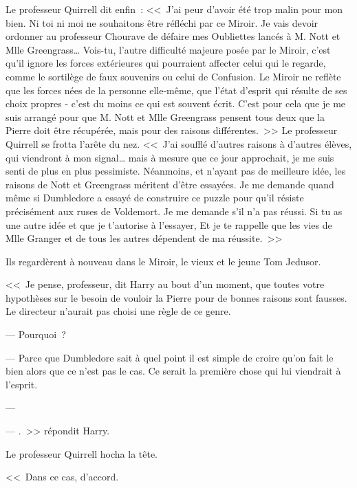 Le professeur Quirrell dit enfin~: <<~J'ai peur d'avoir été trop malin pour mon bien. Ni toi ni moi ne souhaitons être réfléchi par ce Miroir. Je vais devoir ordonner au professeur Chourave de défaire mes Oubliettes lancés à M. Nott et Mlle Greengrass… Vois-tu, l'autre difficulté majeure posée par le Miroir, c'est qu'il ignore les forces extérieures qui pourraient affecter celui qui le regarde, comme le sortilège de faux souvenirs ou celui de Confusion. Le Miroir ne reflète que les forces nées de la personne elle-même, que l'état d'esprit qui résulte de ses choix propres - c'est du moins ce qui est souvent écrit. C'est pour cela que je me suis arrangé pour que M. Nott et Mlle Greengrass pensent tous deux que la Pierre doit être récupérée, mais pour des raisons différentes.~>> Le professeur Quirrell se frotta l'arête du nez. <<~J'ai soufflé d'autres raisons à d'autres élèves, qui viendront à mon signal… mais à mesure que ce jour approchait, je me suis senti de plus en plus pessimiste. Néanmoins, et n'ayant pas de meilleure idée, les raisons de Nott et Greengrass méritent d'être essayées. Je me demande quand même si Dumbledore a essayé de construire ce puzzle pour qu'il résiste précisément aux ruses de Voldemort. Je me demande s'il n'a pas réussi. Si tu as une autre idée et que je t'autorise à l'essayer,  Et je te rappelle que les vies de Mlle Granger et de tous les autres dépendent de ma réussite.~>>

Ils regardèrent à nouveau dans le Miroir, le vieux et le jeune Tom Jedusor.

<<~Je pense, professeur, dit Harry au bout d'un moment, que toutes votre hypothèses sur le besoin de vouloir la Pierre pour de bonnes raisons sont fausses. Le directeur n'aurait pas choisi une règle de ce genre.

--- Pourquoi~?

--- Parce que Dumbledore sait à quel point il est simple de croire qu'on fait le bien alors que ce n'est pas le cas. Ce serait la première chose qui lui viendrait à l'esprit.

--- 

--- .~>> répondit Harry.

Le professeur Quirrell hocha la tête.

<<~Dans ce cas, d'accord.

